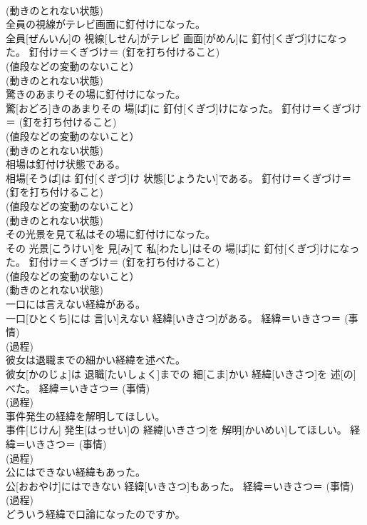 \documentclass[8pt]{extreport}
\begin{document}
\begin{CJK}{UTF8}{min}
{\\	(動きのとれない状態) 
\\	全員の視線がテレビ画面に釘付けになった。	
\\	全員[ぜんいん]の 視線[しせん]がテレビ 画面[がめん]に 釘付[くぎづ]けになった。	釘付け＝くぎづけ＝ (釘を打ち付けること) 
\\	(値段などの変動のないこと）
\\	(動きのとれない状態) 
\\	驚きのあまりその場に釘付けになった。	
\\	驚[おどろ]きのあまりその 場[ば]に 釘付[くぎづ]けになった。	釘付け＝くぎづけ＝ (釘を打ち付けること) 
\\	(値段などの変動のないこと）
\\	(動きのとれない状態) 
\\	相場は釘付け状態である。	
\\	相場[そうば]は 釘付[くぎづ]け 状態[じょうたい]である。	釘付け＝くぎづけ＝ (釘を打ち付けること) 
\\	(値段などの変動のないこと）
\\	(動きのとれない状態) 
\\	その光景を見て私はその場に釘付けになった。	
\\	その 光景[こうけい]を 見[み]て 私[わたし]はその 場[ば]に 釘付[くぎづ]けになった。	釘付け＝くぎづけ＝ (釘を打ち付けること) 
\\	(値段などの変動のないこと）
\\	(動きのとれない状態) 
\\	一口には言えない経緯がある。	
\\	一口[ひとくち]には 言[い]えない 経緯[いきさつ]がある。	経緯＝いきさつ＝ (事情) 
\\	(過程) 
\\	彼女は退職までの細かい経緯を述べた。	
\\	彼女[かのじょ]は 退職[たいしょく]までの 細[こま]かい 経緯[いきさつ]を 述[の]べた。	経緯＝いきさつ＝ (事情) 
\\	(過程) 
\\	事件発生の経緯を解明してほしい。	
\\	事件[じけん] 発生[はっせい]の 経緯[いきさつ]を 解明[かいめい]してほしい。	経緯＝いきさつ＝ (事情) 
\\	(過程) 
\\	公にはできない経緯もあった。	
\\	公[おおやけ]にはできない 経緯[いきさつ]もあった。	経緯＝いきさつ＝ (事情) 
\\	(過程) 
\\	どういう経緯で口論になったのですか。	
}
\end{CJK}
\end{document}
